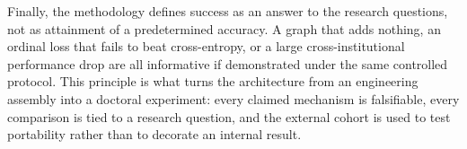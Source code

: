 Finally, the methodology defines success as an answer to the research
questions, not as attainment of a predetermined accuracy. A graph that adds
nothing, an ordinal loss that fails to beat cross-entropy, or a large
cross-institutional performance drop are all informative if demonstrated under
the same controlled protocol. This principle is what turns the architecture
from an engineering assembly into a doctoral experiment: every claimed
mechanism is falsifiable, every comparison is tied to a research question, and
the external cohort is used to test portability rather than to decorate an
internal result.

\printbibliography


